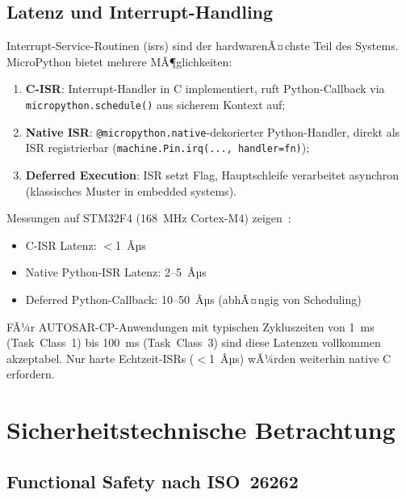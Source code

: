 ﻿\documentclass[12pt,a4paper,twoside]{article}
\begin{document}
\subsection{Latenz und Interrupt-Handling}

\label{subsec:latenz}

Interrupt-Service-Routinen (\glspl{isr}) sind der hardwarenÃ¤chste Teil des Systems.
MicroPython bietet mehrere MÃ¶glichkeiten:

\begin{enumerate}
  \item \textbf{C-ISR}: Interrupt-Handler in C implementiert, ruft Python-Callback
        via \texttt{micropython.\newline schedule()} aus sicherem Kontext auf;
  \item \textbf{Native ISR}: \texttt{@micropython.native}-dekorierter Python-Handler,
        direkt als ISR registrierbar (\texttt{machine.Pin.irq(..., handler=fn)});
  \item \textbf{Deferred Execution}: ISR setzt Flag, Hauptschleife verarbeitet
        asynchron (klassisches Muster in embedded systems).
\end{enumerate}

Messungen auf STM32F4 (168~MHz Cortex-M4) zeigen~\cite{micropython_irq_bench2022}:
\begin{itemize}
  \item C-ISR Latenz: $<$1~Âµs
  \item Native Python-ISR Latenz: 2--5~Âµs
  \item Deferred Python-Callback: 10--50~Âµs (abhÃ¤ngig von Scheduling)
\end{itemize}

FÃ¼r AUTOSAR-CP-Anwendungen mit typischen Zykluszeiten von
1~ms (Task~Class~1) bis 100~ms (Task~Class~3) sind diese Latenzen
vollkommen akzeptabel. Nur harte Echtzeit-ISRs ($<$1~Âµs) wÃ¼rden
weiterhin native C erfordern.

\section{Sicherheitstechnische Betrachtung}
\label{sec:sicherheit}

\subsection{Functional Safety nach ISO~26262}
\label{subsec:fusa}
\end{document}
